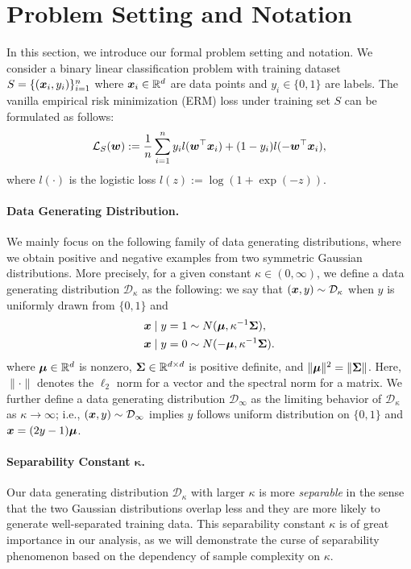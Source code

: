\vspace*{-10pt}
\section{Problem Setting and Notation}\label{section:setting}
In this section, we introduce our formal problem setting and notation. 
We consider a binary linear classification problem with training dataset $S = \{({\bm{x}}_i,y_i)\}_{i=1}^n$ where ${\bm{x}}_i\in \mathbb{R}^d$ are data points and $y_i\in \{0,1\}$ are labels.
The vanilla empirical risk minimization (ERM) loss under training set $S$ can be formulated as follows:
\begin{equation}
\label{eq:1}
   \mathcal{L}_S({\bm{w}}) :=  \frac{1}{n} \sum_{i=1}^n y_i l({\bm{w}}^\top {\bm{x}}_i) + (1-y_i) l(-{\bm{w}}^\top {\bm{x}}_i), 
\end{equation}
where $l(\cdot)$ is the logistic loss $l(z) := \log(1+\exp(-z))$.

\paragraph{Data Generating Distribution.} We mainly focus on the following family of data generating distributions, where we obtain positive and negative examples from two symmetric Gaussian distributions. More precisely, for a given constant $\kappa\in (0, \infty)$, we define a data generating distribution $\mathcal{D}_\kappa$ as the following: we say that $({\bm{x}},y) \sim \mathcal{D}_\kappa$ when $y$ is uniformly drawn from $\{0, 1\}$ and
\begin{align*}
    {\bm{x}} \mid {y=1} &\sim N( {\bm{\mu}} , \kappa^{-1} {\bm{\Sigma}} ), \\
    {\bm{x}} \mid {y=0} &\sim N(-{\bm{\mu}} , \kappa^{-1}{\bm{\Sigma}} ).
\end{align*}
where ${\bm{\mu}} \in \mathbb{R}^d$ is nonzero, ${\bm{\Sigma}} \in \mathbb{R}^{d \times d}$ is positive definite, and $\lVert {\bm{\mu}} \rVert^2 = \lVert {\bm{\Sigma}} \rVert$. Here, $\lVert \cdot \rVert$ denotes the $\ell_2$ norm for a vector and the spectral norm for a matrix. We further define a data generating distribution $\mathcal{D}_\infty$ as the limiting behavior of $\mathcal{D}_\kappa$ as $\kappa \to \infty$; i.e., $({\bm{x}},y) \sim \mathcal{D}_\infty$ implies $y$ follows uniform distribution on $\{0,1\}$ and ${\bm{x}} = (2y-1){\bm{\mu}}$. 

\paragraph{Separability Constant $\bm{\kappa}$.}
Our data generating distribution $\mathcal{D}_\kappa$ with larger $\kappa$ is more \emph{separable} in the sense that the two Gaussian distributions overlap less and they are more likely to generate well-separated training data. This separability constant $\kappa$ is of great importance in our analysis, as we will demonstrate the curse of separability phenomenon based on the dependency of sample complexity on $\kappa$.

